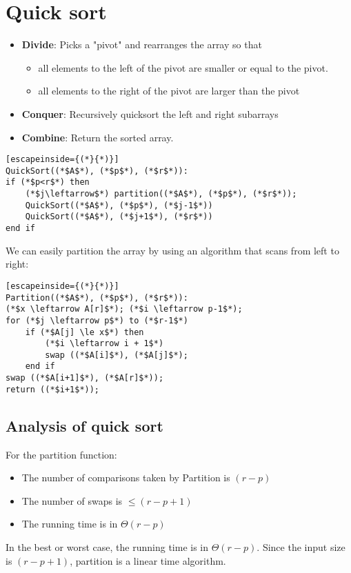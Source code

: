 \documentclass[a4paper]{article}
\begin{document}
\section{Quick sort}
\begin{itemize}
	\item[] \textbf{Divide}: Picks a "pivot" and rearranges the array so that
	\begin{itemize}
		\item all elements to the left of the pivot are smaller or equal to the pivot.
		\item all elements to the right of the pivot are larger than the pivot
	\end{itemize}
	\item[] \textbf{Conquer}: Recursively quicksort the left and right subarrays
	\item[] \textbf{Combine}: Return the sorted array.
\end{itemize}
\begin{lstlisting}[escapeinside={(*}{*)}]
QuickSort((*$A$*), (*$p$*), (*$r$*)):
if (*$p<r$*) then
	(*$j\leftarrow$*) partition((*$A$*), (*$p$*), (*$r$*));
	QuickSort((*$A$*), (*$p$*), (*$j-1$*))
	QuickSort((*$A$*), (*$j+1$*), (*$r$*))
end if
\end{lstlisting}
We can easily partition the array by using an algorithm that scans from left to right:
\begin{lstlisting}[escapeinside={(*}{*)}]
Partition((*$A$*), (*$p$*), (*$r$*)):
(*$x \leftarrow A[r]$*); (*$i \leftarrow p-1$*);
for (*$j \leftarrow p$*) to (*$r-1$*)
	if (*$A[j] \le x$*) then
		(*$i \leftarrow i + 1$*)
		swap ((*$A[i]$*), (*$A[j]$*);
	end if
swap ((*$A[i+1]$*), (*$A[r]$*));
return ((*$i+1$*));
\end{lstlisting}
\subsection{Analysis of quick sort}
For the partition function:
\begin{itemize}
	\item The number of comparisons taken by Partition is $(r-p)$
	\item The number of swaps is $\le (r-p+1)$
	\item The running time is in $\Theta(r-p)$
\end{itemize}
In the best or worst case, the running time is in $\Theta(r-p)$. Since the input size is $(r-p+1)$, partition is a linear time algorithm.
\end{document}
